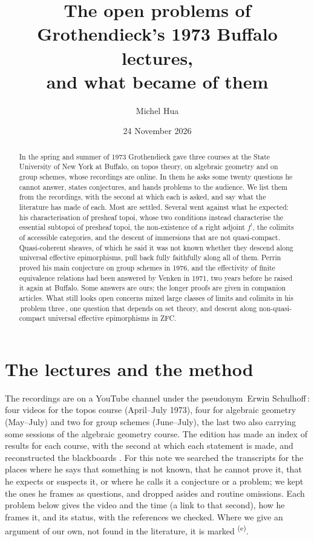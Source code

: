 \documentclass[11pt,a4paper]{amsart}
\title[The open problems of the Buffalo lectures]{The open problems of Grothendieck's 1973 Buffalo lectures,\\ and what became of them}
\author{Michel Hua}
\date{24 November 2026}
\theoremstyle{definition}
\theoremstyle{remark}
\newcommand{\q}[1]{\guillemotleft\,#1\,\guillemotright}
\newcommand{\own}{\textsuperscript{(e)}}
\begin{document}
\begin{abstract}
In the spring and summer of 1973 Grothendieck gave three courses at the State University of New York at Buffalo, on topos theory, on algebraic geometry and on group schemes, whose recordings are online. In them he asks some twenty questions he cannot answer, states conjectures, and hands problems to the audience. We list them from the recordings, with the second at which each is asked, and say what the literature has made of each. Most are settled. Several went against what he expected: his characterisation of presheaf topoi, whose two conditions instead characterise the essential subtopoi of presheaf topoi, the non-existence of a right adjoint $f^!$, the colimits of accessible categories, and the descent of immersions that are not quasi-compact. Quasi-coherent sheaves, of which he said it was not known whether they descend along universal effective epimorphisms, pull back fully faithfully along all of them. Perrin proved his main conjecture on group schemes in 1976, and the effectivity of finite equivalence relations had been answered by Venken in 1971, two years before he raised it again at Buffalo. Some answers are ours; the longer proofs are given in companion articles. What still looks open concerns mixed large classes of limits and colimits in his \q{problem three}, one question that depends on set theory, and descent along non-quasi-compact universal effective epimorphisms in ZFC.
\end{abstract}
\maketitle
\enlargethispage{2pt}

\section{The lectures and the method}

The recordings are on a YouTube channel under the pseudonym \q{Erwin Schulhoff}: four videos for the topos course (April--July 1973), four for algebraic geometry (May--July) and two for group schemes (June--July), the last two also carrying some sessions of the algebraic geometry course. The edition has made an index of results for each course, with the second at which each statement is made, and reconstructed the blackboards \cite{repo}. For this note we searched the transcripts for the places where he says that something is not known, that he cannot prove it, that he expects or suspects it, or where he calls it a conjecture or a problem; we kept the ones he frames as questions, and dropped asides and routine omissions. Each problem below gives the video and the time (a link to that second), how he frames it, and its status, with the references we checked. Where we give an argument of our own, not found in the literature, it is marked \own.
\end{document}
